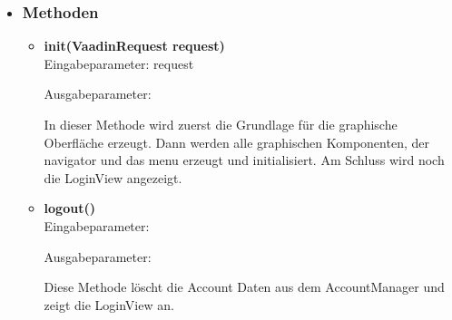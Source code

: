 \begin{itemize}
\begin{itemize}
\end{itemize}

\item \subsubsection{Methoden}
\begin{itemize}
\item \textbf{init(VaadinRequest request)} \hfill\\ 
Eingabeparameter: request

Ausgabeparameter:

In dieser Methode wird zuerst die Grundlage für die graphische Oberfläche erzeugt. Dann werden alle graphischen Komponenten, der navigator und das menu erzeugt und initialisiert. Am Schluss wird noch die LoginView angezeigt.

\item \textbf{logout()} \hfill\\ 
Eingabeparameter:

Ausgabeparameter:

Diese Methode löscht die Account Daten aus dem AccountManager und zeigt die LoginView an.

\end{itemize}

\end{itemize}